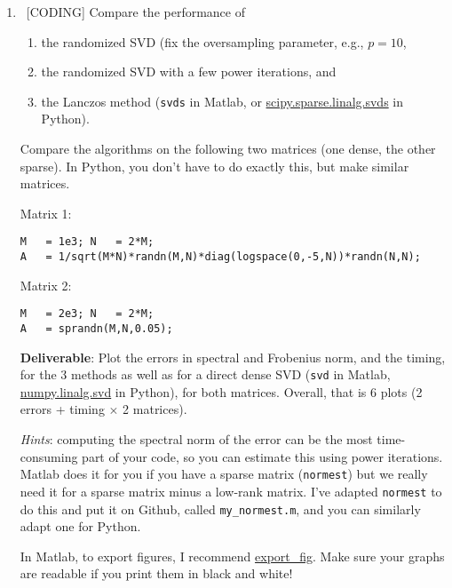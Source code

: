 \documentclass[10pt, letterpaper]{scrartcl}
\begin{document}
\begin{enumerate}[align=left, leftmargin=*, label=\sffamily\bfseries Problem \arabic*:]   
 
    \item \ [CODING] Compare the performance of 
    \begin{enumerate}[noitemsep]
\item the randomized SVD (fix the oversampling parameter, e.g., $p=10$, 
\item the randomized SVD with a few power iterations, and 
\item the Lanczos method (\texttt{svds} in Matlab, or \href{https://docs.scipy.org/doc/scipy/reference/generated/scipy.sparse.linalg.svds.html}{scipy.sparse.linalg.svds} in Python).
    \end{enumerate}
    
    Compare the algorithms on the following two matrices (one dense, the other sparse). In Python, you don't have to do exactly this, but make similar matrices.
    
    Matrix 1:
\begin{lstlisting}
M   = 1e3; N   = 2*M;
A   = 1/sqrt(M*N)*randn(M,N)*diag(logspace(0,-5,N))*randn(N,N);
\end{lstlisting}

    Matrix 2:
\begin{lstlisting}
M   = 2e3; N   = 2*M;
A   = sprandn(M,N,0.05);
\end{lstlisting}
    
    \textbf{Deliverable}: Plot the errors in spectral and Frobenius norm, and the timing, for the 3 methods as well as for a direct dense SVD (\texttt{svd} in Matlab, \href{https://docs.scipy.org/doc/numpy/reference/generated/numpy.linalg.svd.html}{numpy.linalg.svd} in Python), for both matrices.  Overall, that is 6 plots (2 errors + timing $\times$ 2 matrices).
    
    \emph{Hints}: computing the spectral norm of the error can be the most time-consuming part of your code, so you can estimate this using power iterations. Matlab does it for you if you have a sparse matrix (\texttt{normest}) but we really need it for a sparse matrix minus a low-rank matrix. I've adapted \texttt{normest} to do this and put it on Github, called \texttt{my\_normest.m}, and you can similarly adapt one for Python.
    
    In Matlab, to export figures, I recommend \href{https://www.mathworks.com/matlabcentral/fileexchange/23629-export_fig}{export\_fig}. Make sure your graphs are readable if you print them in black and white!


\end{enumerate}
\end{document}
